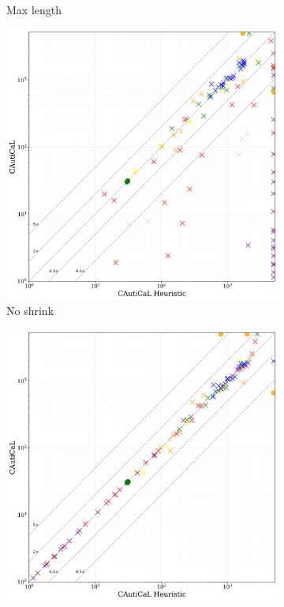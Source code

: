 \begin{figure}[!t]
\begin{subfigure}[t]{0.3\textwidth}
        \caption{Max length}
        \label{fig:global-max-length}
    \end{subfigure}
    \begin{subfigure}[t]{0.3\textwidth}
            \centering
            \includegraphics[width=\textwidth]{figs/globalnoshrink_heuristic_comparison.jpg}
            \caption{No shrink}
            \label{fig:global-no-shrink}
    \end{subfigure}
    \begin{subfigure}[t]{0.3\textwidth}
        \centering
        \includegraphics[width=\textwidth]{figs/global_time_lim_heuristic_comparison.jpg}

\end{subfigure}
\end{figure}
